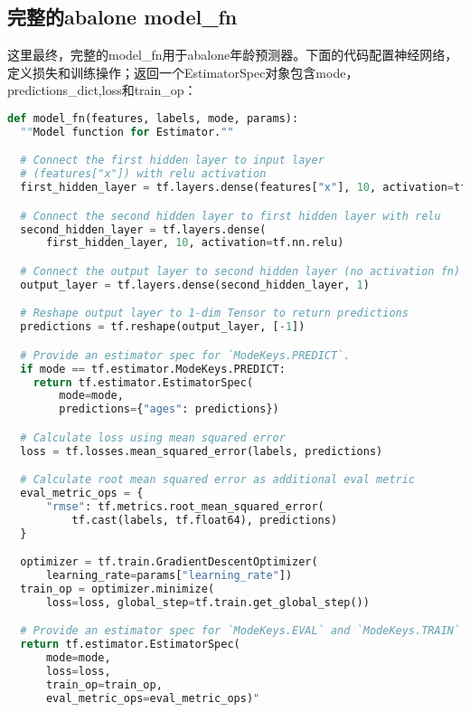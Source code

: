 \subsection{完整的abalone model\_fn}
这里最终，完整的model\_fn用于abalone年龄预测器。下面的代码配置神经网络，定义损失和训练操作；返回一个EstimatorSpec对象包含mode，predictions\_dict,loss和train\_op：
\begin{lstlisting}[language=Python]
def model_fn(features, labels, mode, params):
  ""Model function for Estimator.""

  # Connect the first hidden layer to input layer
  # (features["x"]) with relu activation
  first_hidden_layer = tf.layers.dense(features["x"], 10, activation=tf.nn.relu)

  # Connect the second hidden layer to first hidden layer with relu
  second_hidden_layer = tf.layers.dense(
      first_hidden_layer, 10, activation=tf.nn.relu)

  # Connect the output layer to second hidden layer (no activation fn)
  output_layer = tf.layers.dense(second_hidden_layer, 1)

  # Reshape output layer to 1-dim Tensor to return predictions
  predictions = tf.reshape(output_layer, [-1])

  # Provide an estimator spec for `ModeKeys.PREDICT`.
  if mode == tf.estimator.ModeKeys.PREDICT:
    return tf.estimator.EstimatorSpec(
        mode=mode,
        predictions={"ages": predictions})

  # Calculate loss using mean squared error
  loss = tf.losses.mean_squared_error(labels, predictions)

  # Calculate root mean squared error as additional eval metric
  eval_metric_ops = {
      "rmse": tf.metrics.root_mean_squared_error(
          tf.cast(labels, tf.float64), predictions)
  }

  optimizer = tf.train.GradientDescentOptimizer(
      learning_rate=params["learning_rate"])
  train_op = optimizer.minimize(
      loss=loss, global_step=tf.train.get_global_step())

  # Provide an estimator spec for `ModeKeys.EVAL` and `ModeKeys.TRAIN` modes.
  return tf.estimator.EstimatorSpec(
      mode=mode,
      loss=loss,
      train_op=train_op,
      eval_metric_ops=eval_metric_ops)"
\end{lstlisting}
